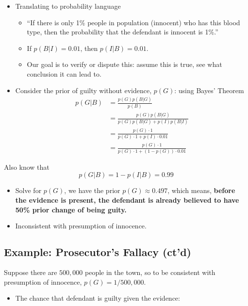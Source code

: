 \documentclass[
]{book}
\providecommand{\tightlist}{%
  \setlength{\itemsep}{0pt}\setlength{\parskip}{0pt}}
\begin{document}
\begin{itemize}
\tightlist
\item
  Translating to probability language

  \begin{itemize}
  \tightlist
  \item
    ``If there is only 1\% people in population (innocent) who has this blood type, then the probability that the defendant is innocent is 1\%.''
  \item
    If \(p(B|I)=0.01\), then \(p(I|B)=0.01\).
  \item
    Our goal is to verify or dispute this: assume this is true, see what conclusion it can lead to.
  \end{itemize}
\item
  Consider the prior of guilty without evidence, \(p(G)\): using Bayes' Theorem
  \[
  \begin{aligned}
  p(G|B) &= \frac{p(G)p(B|G)}{p(B)}\\
  &=  \frac{p(G)p(B|G)}{p(G)p(B|G) + p(I)p(B|I)}\\
  &= \frac{p(G)\cdot 1}{p(G)\cdot 1 + p(I)\cdot 0.01}\\
  &= \frac{p(G)\cdot 1}{p(G)\cdot 1 + (1-p(G))\cdot 0.01}
  \end{aligned}  
  \]
\end{itemize}

Also know that
\[
p(G|B)=1-p(I|B)=0.99 
\]

\begin{itemize}
\tightlist
\item
  Solve for \(p(G)\), we have the prior \(p(G)\approx 0.497\), which means, \textbf{before the evidence is present, the defendant is already believed to have 50\% prior change of being guity.}
\item
  Inconsistent with presumption of innocence.
\end{itemize}

\hypertarget{example-prosecutors-fallacy-ctd}{%
\subsection{Example: Prosecutor's Fallacy (ct'd)}\label{example-prosecutors-fallacy-ctd}}

Suppose there are \(500,000\) people in the town, so to be consistent with presumption of innocence, \(p(G)=1/500,000\).

\begin{itemize}
\tightlist
\item
  The chance that defendant is guilty given the evidence:
\end{itemize}
\end{document}
